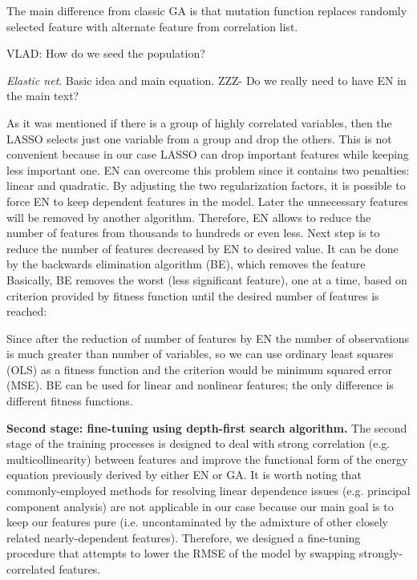 \documentclass[aps,prl,reprint,amsmath,amssymb,nature]{revtex4-1}
\begin{document}
The main difference from classic GA is that mutation function replaces randomly selected feature with alternate feature from correlation list. 

VLAD: How do we seed the population?

\textit{Elastic net}. Basic idea and main equation. ZZZ- Do we really need to have EN in the main text?

As it was mentioned if there is a group of highly correlated variables, 
then the LASSO selects just one variable from a group and drop the 
others. This is not convenient because in our case LASSO can drop 
important features while keeping less important one. EN can overcome 
this problem since it contains two penalties: linear and quadratic. By 
adjusting the two regularization factors, it is possible to force EN to 
keep dependent features in the model. Later the unnecessary features 
will be removed by another algorithm. Therefore, EN allows to reduce the 
number of features from thousands to hundreds or even less. Next step is 
to reduce the number of features decreased by EN to desired value. It 
can be done by the backwards elimination algorithm (BE), which removes 
the feature Basically, BE removes the worst (less significant feature), 
one at a time, based on criterion provided by fitness function until the desired number of features is reached:

Since after the reduction of number of features by EN the number of 
observations is much greater than number of variables, so we can use 
ordinary least squares (OLS) as a fitness function and the criterion 
would be minimum squared error (MSE). BE can be used for linear and 
nonlinear features; the only difference is different fitness functions.

\textbf{Second stage: fine-tuning using depth-first search algorithm.} The second stage of the training processes is designed to deal with strong correlation (e.g. multicollinearity) between features and improve the functional form of the energy equation previously derived by either EN or GA. 
It is worth noting that commonly-employed methods for resolving linear dependence issues (e.g. principal component analysis) are not applicable in our case because our main goal is to keep our features pure (i.e. uncontaminated by the admixture of other closely related nearly-dependent features). 
Therefore, we designed a fine-tuning procedure that attempts to lower the RMSE of the model by swapping strongly-correlated features. 
\end{document}
